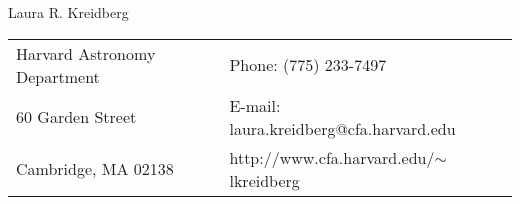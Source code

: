 \documentclass[12pt,letterpaper]{article}
\def\name{Laura R. Kreidberg}
\begin{document}
\sloppy

{\LARGE \name}


\vspace{3 mm}

\begin{tabular}{@{}p{4.0in}@{}p{5.0in}}
Harvard Astronomy Department         & Phone: (775) 233-7497 \\
60 Garden Street                     & E-mail: laura.kreidberg@cfa.harvard.edu\\ 
Cambridge, MA 02138                  & http://www.cfa.harvard.edu/$\sim$lkreidberg \\ 
\end{tabular}

\vspace{8mm}
\end{document}
